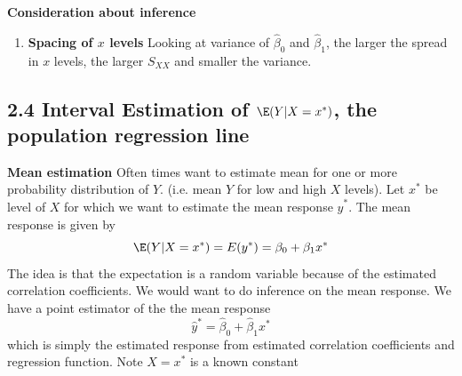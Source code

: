 \documentclass[11pt]{article}
\begin{document}
\begin{defn*}
    \textbf{Consideration about inference}
    \begin{enumerate}
        \item \textbf{Spacing of $x$ levels} Looking at variance of $\hat{\beta}_0$ and $\hat{\beta}_1$, the larger the spread in $x$ levels, the larger $S_{XX}$ and smaller the variance. 
    \end{enumerate}
\end{defn*}



\subsection*{2.4 Interval Estimation of $\E(Y | X = x^*)$, the population regression line}


\begin{defn*}
    \textbf{Mean estimation} Often times want to estimate mean for one or more probability distribution of $Y$. (i.e. mean $Y$ for low and high $X$ levels). Let $x^*$ be level of $X$ for which we want to estimate the mean response $\hat{y}^*$. The mean response is given by 
    \[
        \E(Y | X = x^*) = E(y^*) = \beta_0 + \beta_1 x^*
    \]
    The idea is that the expectation is a random variable because of the estimated correlation coefficients. We would want to do inference on the mean response. We have a point estimator of the the mean response
    \[
        \hat{y}^* = \hat{\beta}_0 + \hat{\beta}_1 x^*
    \]
    which is simply the estimated response from estimated correlation coefficients and regression function. Note $X = x^*$ is a known constant 
\end{defn*}
\end{document}
